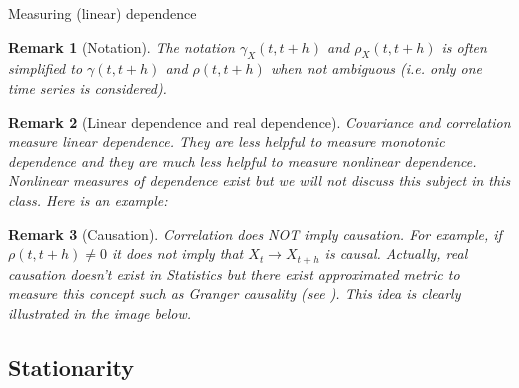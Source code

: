 \documentclass[envcountsect,usenames,dvipsnames]{beamer}
\theoremstyle{mystyle}
\newtheorem{Remark}{Remark}
\begin{document}
\begin{frame}{Measuring (linear) dependence}
\footnotesize
	\begin{Remark}[Notation]
	The notation $\gamma_X(t, t+h)$ and $\rho_X(t, t+h)$ is often simplified to  $\gamma(t, t+h)$ and $\rho(t, t+h)$ when not ambiguous (i.e. only one time series is considered). 
	\end{Remark}
	
\begin{Remark}[Linear dependence and real dependence]
	Covariance and correlation measure linear dependence. They are less helpful to measure monotonic dependence and they are much less helpful to measure nonlinear dependence. Nonlinear measures of dependence exist but we will not discuss this subject in this class. Here is an example:
\end{Remark}


\begin{Remark}[Causation]
    Correlation {\color{beamer@myorange} \emph{does NOT}} imply causation. For example, if $\rho(t, t+h) \neq 0$ it does not imply that $X_t \to X_{t+h}$ is causal. Actually, real causation doesn't exist in Statistics but there exist approximated metric to measure this concept such as Granger causality (see \cite{granger1969investigating}). This idea is clearly illustrated in the image below. 
\end{Remark}

	
\end{frame}




\subsection{Stationarity}
\end{document}
